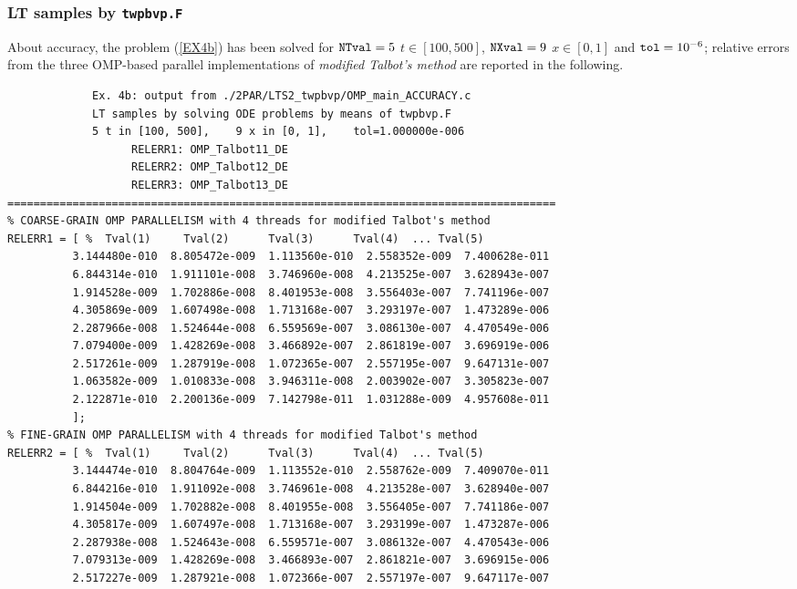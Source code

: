\documentclass[a4paper,10pt]{report}%
\begin{document}
\newpage
\subsubsection{LT samples by {\tt twpbvp.F}}
About accuracy, the problem (\ref{EX4b}) has been solved for ${\tt NTval}=5$ $t\in[100, 500]$,
${\tt NXval}=9$ $x\in[0,1]$ and ${\tt tol}=10^{-6}$; relative errors from the three OMP-based parallel
implementations of {\em modified Talbot's method} are reported in the following.
\begin{lstlisting}
             Ex. 4b: output from ./2PAR/LTS2_twpbvp/OMP_main_ACCURACY.c
             LT samples by solving ODE problems by means of twpbvp.F
             5 t in [100, 500],    9 x in [0, 1],    tol=1.000000e-006
                   RELERR1: OMP_Talbot11_DE
                   RELERR2: OMP_Talbot12_DE
                   RELERR3: OMP_Talbot13_DE
====================================================================================
% COARSE-GRAIN OMP PARALLELISM with 4 threads for modified Talbot's method
RELERR1 = [ %  Tval(1)     Tval(2)      Tval(3)      Tval(4)  ... Tval(5)
          3.144480e-010  8.805472e-009  1.113560e-010  2.558352e-009  7.400628e-011
          6.844314e-010  1.911101e-008  3.746960e-008  4.213525e-007  3.628943e-007
          1.914528e-009  1.702886e-008  8.401953e-008  3.556403e-007  7.741196e-007
          4.305869e-009  1.607498e-008  1.713168e-007  3.293197e-007  1.473289e-006
          2.287966e-008  1.524644e-008  6.559569e-007  3.086130e-007  4.470549e-006
          7.079400e-009  1.428269e-008  3.466892e-007  2.861819e-007  3.696919e-006
          2.517261e-009  1.287919e-008  1.072365e-007  2.557195e-007  9.647131e-007
          1.063582e-009  1.010833e-008  3.946311e-008  2.003902e-007  3.305823e-007
          2.122871e-010  2.200136e-009  7.142798e-011  1.031288e-009  4.957608e-011
          ];
% FINE-GRAIN OMP PARALLELISM with 4 threads for modified Talbot's method
RELERR2 = [ %  Tval(1)     Tval(2)      Tval(3)      Tval(4)  ... Tval(5)
          3.144474e-010  8.804764e-009  1.113552e-010  2.558762e-009  7.409070e-011
          6.844216e-010  1.911092e-008  3.746961e-008  4.213528e-007  3.628940e-007
          1.914504e-009  1.702882e-008  8.401955e-008  3.556405e-007  7.741186e-007
          4.305817e-009  1.607497e-008  1.713168e-007  3.293199e-007  1.473287e-006
          2.287938e-008  1.524643e-008  6.559571e-007  3.086132e-007  4.470543e-006
          7.079313e-009  1.428269e-008  3.466893e-007  2.861821e-007  3.696915e-006
          2.517227e-009  1.287921e-008  1.072366e-007  2.557197e-007  9.647117e-007

\end{lstlisting}
\end{document}
